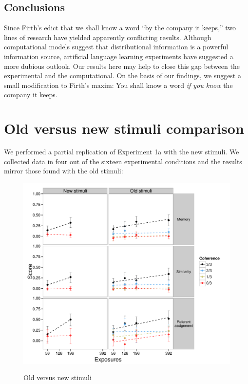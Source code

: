 \documentclass[man,longtable, floatmark]{my-apa6}
\begin{document}
\subsection{Conclusions}

Since Firth's edict that we shall know a word ``by the company it keeps,'' two lines of research have yielded apparently conflicting results. Although computational models suggest that distributional information is a powerful information source, artificial language learning experiments have suggested a more dubious outlook. Our results here may help to close this gap between the experimental and the computational. On the basis of our findings, we suggest a small modification to Firth's maxim: You shall know a word \emph{if you know} the company it keeps.

\setcounter{secnumdepth}{0}

\newpage





\appendix
\section{Old versus new stimuli comparison}
\label{old-vs-new}

We performed a partial replication of Experiment 1a with the new stimuli. We collected data in four out of the sixteen experimental conditions and the results mirror those found with the old stimuli:
\begin{figure}
  \centering
  \includegraphics[width=0.9\linewidth]{stim-comparison} \\
  \caption{Old versus new stimuli}
  \label{fig:old-vs-new}
\end{figure}
\end{document}
